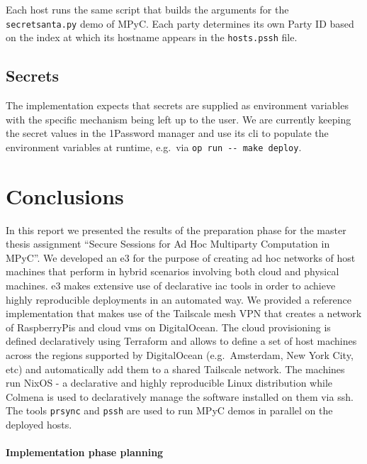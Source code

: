 Each host runs the same script that builds the arguments for the
\texttt{secretsanta.py} demo of MPyC. Each party determines its own
Party ID based on the index at which its hostname appears in the
\texttt{hosts.pssh} file.

\hypertarget{secrets}{%
\section{Secrets}\label{secrets}}

The implementation expects that secrets are supplied as environment
variables with the specific mechanism being left up to the user. We are
currently keeping the secret values in the 1Password manager and use its
\gls{cli} to populate the environment variables at runtime, e.g.~via
\texttt{op\ run\ -\/-\ make\ deploy}.

\hypertarget{conclusions}{%
\chapter{Conclusions}\label{conclusions}}

In this report we presented the results of the preparation phase for the
master thesis assignment ``Secure Sessions for Ad Hoc Multiparty
Computation in MPyC''. We developed an \acrfull{e3} for the purpose of
creating ad hoc networks of host machines that perform 
in hybrid scenarios involving both cloud and physical machines. \gls{e3}
makes extensive use of declarative \gls{iac} tools in order to achieve
highly reproducible deployments in an automated way. We provided a
reference implementation that makes use of the Tailscale mesh VPN that
creates a network of RaspberryPis and cloud \glspl{vm} on DigitalOcean.
The cloud provisioning is defined declaratively using Terraform and
allows to define a set of host machines across the regions supported by
DigitalOcean (e.g.~Amsterdam, New York City, etc) and automatically add
them to a shared Tailscale network. The machines run NixOS - a
declarative and highly reproducible Linux distribution while Colmena is
used to declaratively manage the software installed on them via
\gls{ssh}. The tools \texttt{prsync} and \texttt{pssh} are used to run
MPyC demos in parallel on the deployed hosts.

\hypertarget{implementation-phase-planning}{%
\subsubsection{Implementation phase
planning}\label{implementation-phase-planning}}

